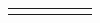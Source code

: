 \documentclass[letterpaper]{article}
\title{}
\author{}
\date{}
\begin{document}
\clearpage\setcounter{page}{1}\pagestyle{HTML}
{\color{black}
~}

\begin{figure}[hbp]
\centering
\begin{minipage}{12.1146in}
\begin{flushleft}
\tablefirsthead{}
\tablehead{}
\tabletail{}
\tablelasttail{}
\begin{supertabular}{|m{0.8913598in}|m{1.0997599in}|m{3.3018599in}|m{0.8809598in}|m{0.6198598in}|m{4.84626in}|}
\hline
{\color{black} %
%
}
\end{supertabular}
\end{flushleft}
\end{minipage}
\end{figure}
\end{document}
